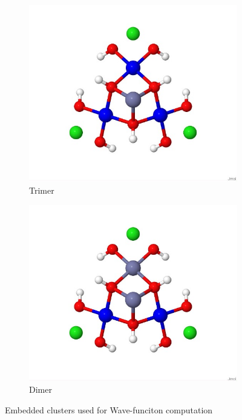 \documentclass[10pt]{report}
\numberwithin{equation}{section}
\begin{document}
\begin{figure}
    \centering
    \begin{subfigure}{.5\textwidth}
      \centering
      \includegraphics[width=\linewidth]{Images/Trimere.jpg}
      \caption{Trimer}
      \label{fig:subtrimer}
    \end{subfigure}%
    \begin{subfigure}{.5\textwidth}
      \centering
      \includegraphics[width=\linewidth]{Images/Dimer.jpg}
      \caption{Dimer}
      \label{fig:subdimer}
    \end{subfigure}
    \caption{Embedded clusters used for Wave-funciton computation}
    \label{fig:FragmentWF}
    \end{figure}
\end{document}
